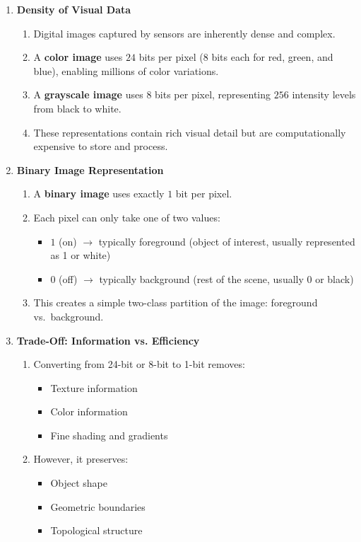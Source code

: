\documentclass[12pt]{article}
\begin{document}
\begin{enumerate}
    \item \textbf{Density of Visual Data}
          \begin{enumerate}
              \item Digital images captured by sensors are inherently dense and complex.
              \item A \textbf{color image} uses $24$ bits per pixel (8 bits each for red, green, and blue), enabling millions of color variations.
              \item A \textbf{grayscale image} uses $8$ bits per pixel, representing $256$ intensity levels from black to white.
              \item These representations contain rich visual detail but are computationally expensive to store and process.
          \end{enumerate}

    \item \textbf{Binary Image Representation}
          \begin{enumerate}
              \item A \textbf{binary image} uses exactly $1$ bit per pixel.
              \item Each pixel can only take one of two values:
                    \begin{itemize}
                        \item $1$ (on) $\rightarrow$ typically foreground (object of interest, usually represented as 1 or white)
                        \item $0$ (off) $\rightarrow$ typically background (rest of the scene, usually 0 or black)
                    \end{itemize}
              \item This creates a simple two-class partition of the image: foreground vs.\ background.
          \end{enumerate}

    \item \textbf{Trade-Off: Information vs. Efficiency}
          \begin{enumerate}
              \item Converting from 24-bit or 8-bit to 1-bit removes:
                    \begin{itemize}
                        \item Texture information
                        \item Color information
                        \item Fine shading and gradients
                    \end{itemize}
              \item However, it preserves:
                    \begin{itemize}
                        \item Object shape
                        \item Geometric boundaries
                        \item Topological structure
                    \end{itemize}
          \end{enumerate}


\end{enumerate}
\end{document}
